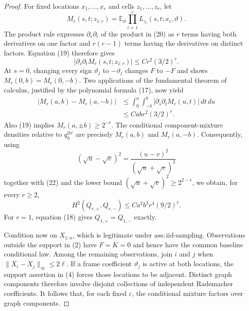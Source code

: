 \documentclass{article}
\begin{document}
\begin{proof}
For fixed locations \(x_1,\ldots,x_r\) and cells \(z_1,\ldots,z_r\), let
\[
 M_r(s,t;z_{1:r})
 =\mathbb E_\vartheta\prod_{i=1}^r
 L_{z_i}(s,t;x_i,\vartheta).                                    \tag{20}
\]
The product rule expresses \(\partial_s\partial_t\) of the product in (20) as \(r\) terms having both derivatives on one factor and \(r(r-1)\) terms having the derivatives on distinct factors.  Equation (19) therefore gives
\[
 |\partial_s\partial_tM_r(s,t;z_{1:r})|
 \le Cr^2(3/2)^r.                                                \tag{21}
\]
At \(s=0\), changing every sign \(\vartheta_j\) to \(-\vartheta_j\) changes \(F\) to \(-F\) and shows \(M_r(0,b)=M_r(0,-b)\).  Two applications of the fundamental theorem of calculus, justified by the polynomial formula (17), now yield
\[
\begin{aligned}
 |M_r(a,b)-M_r(a,-b)|
 &\le\int_0^a\int_{-b}^b
 |\partial_s\partial_tM_r(u,t)|\,dt\,du\\
 &\le Cabr^2(3/2)^r.                                             \tag{22}
\end{aligned}
\]
Also (19) implies \(M_r(a,\pm b)\ge2^{-r}\).  The conditional component-mixture densities relative to \(q_0^{\otimes r}\) are precisely \(M_r(a,b)\) and \(M_r(a,-b)\).  Consequently, using
\[
 (\sqrt u-\sqrt v)^2=\frac{(u-v)^2}{(\sqrt u+\sqrt v)^2}
\]
together with (22) and the lower bound \((\sqrt u+\sqrt v)^2\ge 2^{2-r}\), we obtain, for every \(r\ge2\),
\[
 H^2(Q_{r,+},Q_{r,-})
 \le Ca^2b^2r^4(9/2)^r.                                        \tag{23}
\]
For \(r=1\), equation (18) gives \(Q_{1,+}=Q_{1,-}\) exactly.

Condition now on \(X_{1:n}\), which is legitimate under \(\mathrm{ass:iid\mbox{-}sampling}\).  Observations outside the support in (2) have \(F=K=0\) and hence have the common baseline conditional law.  Among the remaining observations, join \(i\) and \(j\) when \(\lVert X_i-X_j\rVert_\infty\le2\ell\).  If a frame coefficient \(\vartheta_j\) is active at both locations, the support assertion in (4) forces those locations to be adjacent.  Distinct graph components therefore involve disjoint collections of independent Rademacher coefficients.  It follows that, for each fixed \(\varepsilon\), the conditional mixture factors over graph components.


\end{proof}
\end{document}
